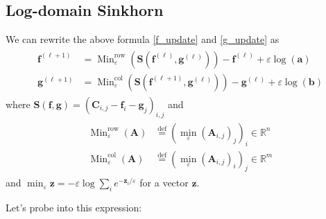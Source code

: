 \documentclass{article}
\begin{document}
\begin{large}
\subsection{Log-domain Sinkhorn}
We can rewrite the above formula \ref{f_update} and \ref{g_update} as
\begin{align}
\begin{aligned} \mathbf { f } ^ { ( \ell + 1 ) } & = \operatorname { Min } _ { \varepsilon } ^ { \mathrm { row } } \left( \mathbf { S } \left( \mathbf { f } ^ { ( \ell ) } , \mathbf { g } ^ { ( \ell ) } \right) \right) - \mathbf { f } ^ { ( \ell ) } + \varepsilon \log ( \mathbf { a } ) \\ \mathbf { g } ^ { ( \ell + 1 ) } & = \operatorname { Min } _ { \varepsilon } ^ { \mathrm { col } } \left( \mathbf { S } \left( \mathbf { f } ^ { ( \ell + 1 ) } , \mathbf { g } ^ { ( \ell ) } \right) \right) - \mathbf { g } ^ { ( \ell ) } + \varepsilon \log ( \mathbf { b } ) \end{aligned}
\label{log update}
\end{align}
where $\mathbf { S } ( \mathbf { f } , \mathbf { g } ) = \left( \mathbf { C } _ { i , j } - \mathbf { f } _ { i } - \mathbf { g } _ { j } \right) _ { i , j }$ and
\begin{align}
\begin{aligned} \operatorname { Min } _ { \varepsilon } ^ { \mathrm { row } } ( \mathbf { A } ) &\stackrel { \mathrm { def } } { = } \left( \min _ { \varepsilon } \left( \mathbf { A } _ { i , j } \right) _ { j } \right) _ { i }  \in \mathbb { R } ^ { n } \\ \operatorname { Min } _ { \varepsilon } ^ { \mathrm { col } } ( \mathbf { A } ) &\stackrel { \mathrm { def} } { = }  \left( \min _ { \varepsilon } \left( \mathbf { A } _ { i , j } \right) _ { i } \right) _ { j } \in \mathbb { R } ^ { m } \end{aligned}
\end{align}
and $\min _ { \varepsilon } \mathbf { z } = - \varepsilon \log \sum _ { i } e ^ { - \mathbf { z } _ { i } / \varepsilon }$ for a vector $\mathbf{z}$.

Let's probe into this expression:


\end{large}
\end{document}
